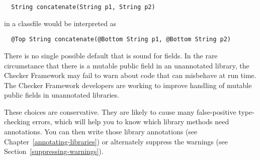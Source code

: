 \begin{Verbatim}
  String concatenate(String p1, String p2)
\end{Verbatim}

\noindent
in a classfile would be interpreted as

\begin{Verbatim}
  @Top String concatenate(@Bottom String p1, @Bottom String p2)
\end{Verbatim}

There is no single possible default that is sound for fields.  In the rare
circumstance that there is a mutable public field in an unannotated
library, the Checker Framework may fail to warn about code that can
misbehave at run time.  The Checker Framework developers are working to
improve handling of mutable public fields in unannotated libraries.



These choices are conservative.  They are likely to cause many
false-positive type-checking errors, which will help you to know which
library methods need annotations.  You can then write those library
annotations (see Chapter~\ref{annotating-libraries}) or alternately
suppress the warnings (see Section~\ref{suppressing-warnings}).




